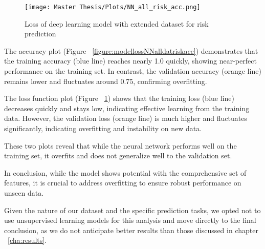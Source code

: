 \FloatBarrier
\begin{figure}[h!]
    \centering
    \texttt{[image: Master Thesis/Plots/NN\_all\_risk\_acc.png]}
    \caption{Loss of deep learning model with extended dataset for risk prediction}
\label{figure:modelaccNNalldatariskloss}
\end{figure}
\FloatBarrier

The accuracy plot (Figure ~\ref{figure:modellossNNalldatriskacc}) demonstrates that the training accuracy (blue line) reaches nearly 1.0 quickly, showing near-perfect performance on the training set. In contrast, the validation accuracy (orange line) remains lower and fluctuates around 0.75, confirming overfitting.

The loss function plot (Figure ~\ref{figure:modelaccNNalldatariskloss}) shows that the training loss (blue line) decreases quickly and stays low, indicating effective learning from the training data. However, the validation loss (orange line) is much higher and fluctuates significantly, indicating overfitting and instability on new data.

These two plots reveal that while the neural network performs well on the training set, it overfits and does not generalize well to the validation set.

In conclusion, while the model shows potential with the comprehensive set of features, it is crucial to address overfitting to ensure robust performance on unseen data. 

Given the nature of our dataset and the specific prediction tasks, we opted not to use unsupervised learning models for this analysis and move directly to the final conclusion, as we do not anticipate better results than those discussed in chapter ~\ref{cha:results}.

\newpage
